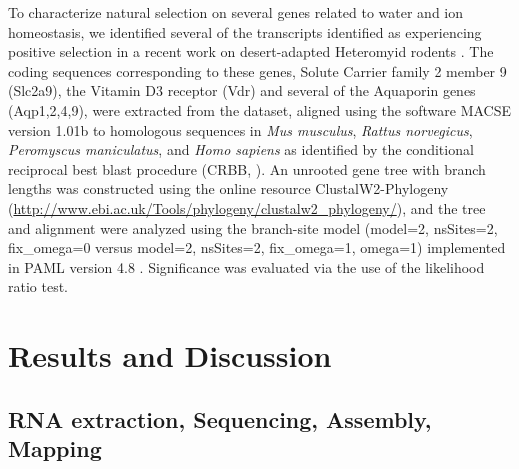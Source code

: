 \documentclass[12pt]{article}
\begin{document}
To characterize natural selection on several genes related to water and ion homeostasis, we identified several of the transcripts identified as experiencing positive selection in a recent work on desert-adapted Heteromyid rodents \citep{Marra:2014de}. The coding sequences corresponding to these genes, Solute Carrier family 2 member 9  (Slc2a9), the Vitamin D3 receptor (Vdr) and several of the Aquaporin genes (Aqp1,2,4,9), were extracted from the dataset, aligned using the software MACSE version 1.01b \citep{Ranwez:2011kj} to homologous sequences in \textit{Mus musculus}, \textit{Rattus norvegicus}, \textit{Peromyscus maniculatus}, and \textit{Homo sapiens} as identified by the conditional reciprocal best blast procedure (CRBB, \citep{Aubry:2014en}). An unrooted gene tree with branch lengths was constructed using the online resource ClustalW2-Phylogeny (\url{http://www.ebi.ac.uk/Tools/phylogeny/clustalw2_phylogeny/}), and the tree and alignment were analyzed using the branch-site model (model=2, nsSites=2, fix\_omega=0 versus model=2, nsSites=2, fix\_omega=1, omega=1)  implemented in PAML version 4.8 \citep{Yang:2011bm,Yang:2007ki}. Significance was evaluated via the use of the likelihood ratio test. \\   


\section*{Results and Discussion}

\subsection*{RNA extraction, Sequencing, Assembly, Mapping}
\end{document}
